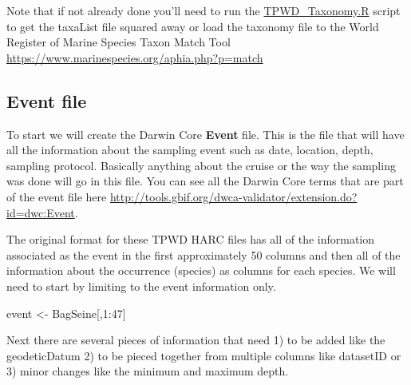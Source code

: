 \documentclass[
]{book}
\newenvironment{Shaded}{\begin{snugshade}}{\end{snugshade}}
\newcommand{\DecValTok}[1]{\textcolor[rgb]{0.00,0.00,0.81}{#1}}
\newcommand{\NormalTok}[1]{#1}
\newcommand{\OtherTok}[1]{\textcolor[rgb]{0.56,0.35,0.01}{#1}}
\newcommand{\SpecialCharTok}[1]{\textcolor[rgb]{0.00,0.00,0.00}{#1}}
\begin{document}
Note that if not already done you'll need to run the \href{https://www.sciencebase.gov/catalog/file/get/53a887f4e4b075096c60cfdd?f=__disk__ab\%2F6e\%2Ff8\%2Fab6ef8426ea328cb6c54d13ee7b6b7ce791d23f8}{TPWD\_Taxonomy.R} script to get the taxaList file squared away or load the taxonomy file to the World Register of Marine Species Taxon Match Tool \url{https://www.marinespecies.org/aphia.php?p=match}

\hypertarget{event-file}{%
\subsection{Event file}\label{event-file}}

To start we will create the Darwin Core \textbf{Event} file. This is the file that will have all the information about the sampling event such as date, location, depth, sampling protocol. Basically anything about the cruise or the way the sampling was done will go in this file. You can see all the Darwin Core terms that are part of the event file here \url{http://tools.gbif.org/dwca-validator/extension.do?id=dwc:Event}.

The original format for these TPWD HARC files has all of the information associated as the event in the first approximately 50 columns and then all of the information about the occurrence (species) as columns for each species. We will need to start by limiting to the event information only.

\begin{Shaded}
\begin{Highlighting}[]
\NormalTok{event }\OtherTok{\textless{}{-}}\NormalTok{ BagSeine[,}\DecValTok{1}\SpecialCharTok{:}\DecValTok{47}\NormalTok{]}
\end{Highlighting}
\end{Shaded}

Next there are several pieces of information that need
1) to be added like the geodeticDatum
2) to be pieced together from multiple columns like datasetID or
3) minor changes like the minimum and maximum depth.
\end{document}

